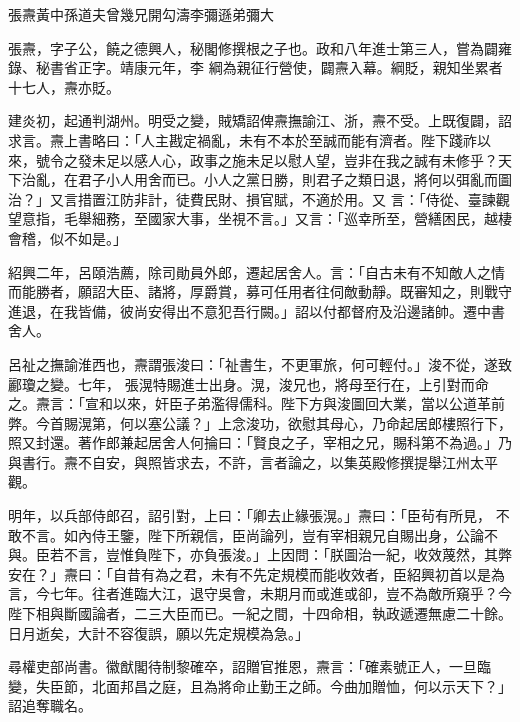 
\begin{pinyinscope}

 張燾黃中孫道夫曾幾兄開勾濤李彌遜弟彌大



 張燾，字子公，饒之德興人，秘閣修撰根之子也。政和八年進士第三人，嘗為闢雍錄、秘書省正字。靖康元年，李
 綱為親征行營使，闢燾入幕。綱貶，親知坐累者十七人，燾亦貶。



 建炎初，起通判湖州。明受之變，賊矯詔俾燾撫諭江、浙，燾不受。上既復闢，詔求言。燾上書略曰：「人主戡定禍亂，未有不本於至誠而能有濟者。陛下踐祚以來，號令之發未足以感人心，政事之施未足以慰人望，豈非在我之誠有未修乎？天下治亂，在君子小人用舍而已。小人之黨日勝，則君子之類日退，將何以弭亂而圖治？」又言措置江防非計，徒費民財、損官賦，不適於用。又
 言：「侍從、臺諫觀望意指，毛舉細務，至國家大事，坐視不言。」又言：「巡幸所至，營繕困民，越棲會稽，似不如是。」



 紹興二年，呂頤浩薦，除司勛員外郎，遷起居舍人。言：「自古未有不知敵人之情而能勝者，願詔大臣、諸將，厚爵賞，募可任用者往伺敵動靜。既審知之，則戰守進退，在我皆備，彼尚安得出不意犯吾行闕。」詔以付都督府及沿邊諸帥。遷中書舍人。



 呂祉之撫諭淮西也，燾謂張浚曰：「祉書生，不更軍旅，何可輕付。」浚不從，遂致酈瓊之變。七年，
 張滉特賜進士出身。滉，浚兄也，將母至行在，上引對而命之。燾言：「宣和以來，奸臣子弟濫得儒科。陛下方與浚圖回大業，當以公道革前弊。今首賜滉第，何以塞公議？」上念浚功，欲慰其母心，乃命起居郎樓照行下，照又封還。著作郎兼起居舍人何掄曰：「賢良之子，宰相之兄，賜科第不為過。」乃與書行。燾不自安，與照皆求去，不許，言者論之，以集英殿修撰提舉江州太平觀。



 明年，以兵部侍郎召，詔引對，上曰：「卿去止緣張滉。」燾曰：「臣茍有所見，
 不敢不言。如內侍王鑒，陛下所親信，臣尚論列，豈有宰相親兄自賜出身，公論不與。臣若不言，豈惟負陛下，亦負張浚。」上因問：「朕圖治一紀，收效蔑然，其弊安在？」燾曰：「自昔有為之君，未有不先定規模而能收效者，臣紹興初首以是為言，今七年。往者進臨大江，退守吳會，未期月而或進或卻，豈不為敵所窺乎？今陛下相與斷國論者，二三大臣而已。一紀之間，十四命相，執政遞遷無慮二十餘。日月逝矣，大計不容復誤，願以先定規模為急。」



 尋權吏部尚書。徽猷閣待制黎確卒，詔贈官推恩，燾言：「確素號正人，一旦臨變，失臣節，北面邦昌之庭，且為將命止勤王之師。今曲加贈恤，何以示天下？」詔追奪職名。




\end{pinyinscope}
